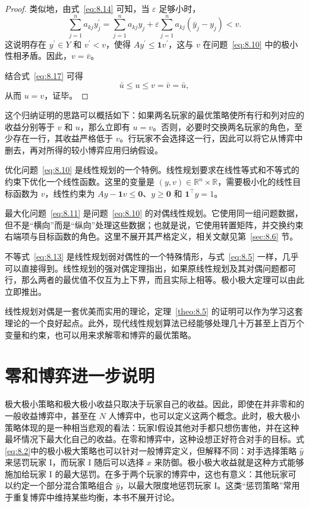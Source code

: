 \begin{proof}
类似地，由式~\eqref{eq:8.14} 可知，当 \(\varepsilon\) 足够小时，
\[
\sum_{j=1}^{n}a_{kj}y_j^{\prime}
=\sum_{j=1}^{n}a_{kj}y_j
+\varepsilon\sum_{j=1}^{n}a_{kj}
 \left(\bar{y}_j-y_j\right)
<v.
\]
这说明存在 \(y^{\prime}\in Y\) 和 \(v^{\prime}<v\)，使得 \(Ay^{\prime}\leq\mathbf{1}v^{\prime}\)，这与 \(v\) 在问题~\eqref{eq:8.10} 中的极小性相矛盾。因此，\(v=\bar{v}\)。

结合式~\eqref{eq:8.17} 可得
\[
\bar{u}\leq u\leq v=\bar{v}=\bar{u},
\]
从而 \(u=v\)，证毕。
\end{proof}

这个归纳证明的思路可以概括如下：如果两名玩家的最优策略使所有行和列对应的收益分别等于 \(v\) 和 \(u\)，那么立即有 \(u=v\)。否则，必要时交换两名玩家的角色，至少存在一行，其收益严格低于 \(v\)。行玩家不会选择这一行，因此可以将它从博弈中删去，再对所得的较小博弈应用归纳假设。

优化问题~\eqref{eq:8.10} 是线性规划的一个特例。线性规划要求在线性等式和不等式的约束下优化一个线性函数。这里的变量是 \((y,v)\in\mathbb{R}^{n}\times\mathbb{R}\)，需要极小化的线性目标函数为 \(v\)，线性约束为 \(Ay-\mathbf{1}v\leq\mathbf{0}\)、\(y\geq\mathbf{0}\) 和 \(\mathbf{1}^{\top}y=1\)。

最大化问题~\eqref{eq:8.11} 是问题~\eqref{eq:8.10} 的对偶线性规划。它使用同一组问题数据，但不是“横向”而是“纵向”处理这些数据；也就是说，它使用转置矩阵，并交换约束右端项与目标函数的角色。这里不展开其严格定义，相关文献见第~\ref{sec:8.6} 节。

不等式~\eqref{eq:8.13} 是线性规划弱对偶性的一个特殊情形，与式~\eqref{eq:8.5} 一样，几乎可以直接得到。线性规划的强对偶定理指出，如果原线性规划及其对偶问题都可行，那么两者的最优值不仅互为上下界，而且实际上相等。极小极大定理可以由此立即推出。

线性规划对偶是一套优美而实用的理论，定理~\ref{theo:8.5} 的证明可以作为学习这套理论的一个良好起点。此外，现代线性规划算法已经能够处理几十万甚至上百万个变量和约束，也可以用来求解零和博弈的最优策略。
\section{零和博弈进一步说明}\label{sec:8.5}

极大极小策略和极大极小收益只取决于玩家自己的收益。因此，即使在并非零和的一般收益博弈中，甚至在 \(N\) 人博弈中，也可以定义这两个概念。此时，极大极小策略体现的是一种相当悲观的看法：玩家I假设其他对手都只想伤害他，并在这种最坏情况下最大化自己的收益。在零和博弈中，这种设想正好符合对手的目标。式\eqref{eq:8.2}中的极小极大策略也可以针对一般博弈定义，但解释不同：对手选择策略 \(\widehat{y}\) 来惩罚玩家 \(\mathrm{I}\)，而玩家 \(\mathrm{I}\) 随后可以选择 \(x\) 来防御。极小极大收益就是这种方式能够施加给玩家 I 的最大惩罚。在多于两个玩家的博弈中，这也有意义：其他玩家可以约定一个部分混合策略组合 \(\widehat{y}\)，以最大限度地惩罚玩家 I。这类“惩罚策略”常用于重复博弈中维持某些均衡，本书不展开讨论。

